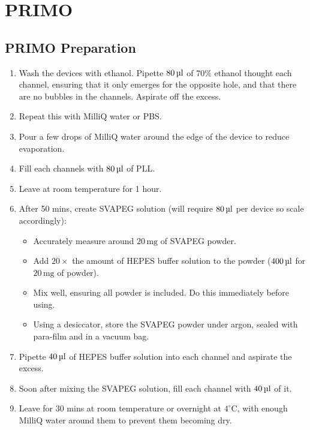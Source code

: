 \section{PRIMO}

\subsection{PRIMO Preparation}

\begin{enumerate}
	 \setlength\itemsep{-0.1em}
	\item Wash the devices with ethanol. Pipette $80 \, \text{\textmu l}$ of $70\%$ ethanol thought each channel, ensuring that it only emerges for the opposite hole, and that there are no bubbles in the channels. Aspirate off the excess.
	\item Repeat this with MilliQ water or PBS.
	\item Pour a few drops of MilliQ water around the edge of the device to reduce evaporation.
	\item Fill each channels with $80 \, \text{\textmu l}$ of PLL.
	\item Leave at room temperature for 1 hour.
	\item After 50 mins, create SVAPEG solution (will require $80 \, \text{\textmu l}$ per device so scale accordingly):
	\begin{itemize}
		 \setlength\itemsep{-0.1em}
		\item Accurately measure around $20 \, \text{mg}$ of SVAPEG powder.
		\item Add $20 \times$ the amount of HEPES buffer solution to the powder ($400 \, \text{\textmu l}$ for $20 \, \text{mg}$ of powder). 
		\item Mix well, ensuring all powder is included. Do this immediately before using.
		\item Using a desiccator, store the SVAPEG powder under argon, sealed with para-film and in a vacuum bag.
	\end{itemize}
	\item Pipette $40 \, \text{\textmu l}$ of HEPES buffer solution into each channel and aspirate the excess.
	\item Soon after mixing the SVAPEG solution, fill each channel with $40 \, \text{\textmu l}$ of it.
	\item Leave for 30 mins at room temperature or overnight at $4^{\circ}$C, with enough MilliQ water around them to prevent them becoming dry.
\end{enumerate}

